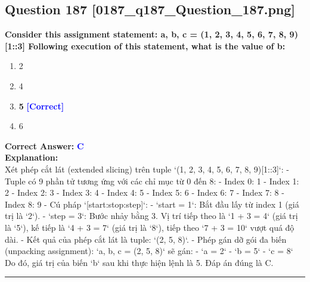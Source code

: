 \documentclass[11pt,a4paper]{article}
\begin{document}
\begin{minipage}{\textwidth}
\subsection*{Question 187 \quad \footnotesize{[0187_q187_Question_187.png]}}
\noindent \textbf{Consider this assignment statement: a, b, c = (1, 2, 3, 4, 5, 6, 7, 8, 9)[1::3] Following execution of this statement, what is the value of b:}

\begin{enumerate}[label=\Alph*.]
    \item 2
    \item 4
    \item \textbf{5} \hfill \textcolor{blue}{\textbf{[Correct]}}
    \item 6
\end{enumerate}

\noindent \textbf{Correct Answer:} \textcolor{blue}{\textbf{C}} \\[4pt]
\noindent \textbf{Explanation:}\\
Xét phép cắt lát (extended slicing) trên tuple `(1, 2, 3, 4, 5, 6, 7, 8, 9)[1::3]`:\newline
- Tuple có 9 phần tử tương ứng với các chỉ mục từ 0 đến 8:\newline
  - Index 0: 1\newline
  - Index 1: 2\newline
  - Index 2: 3\newline
  - Index 3: 4\newline
  - Index 4: 5\newline
  - Index 5: 6\newline
  - Index 6: 7\newline
  - Index 7: 8\newline
  - Index 8: 9\newline
- Cú pháp `[start:stop:step]`:\newline
  - `start = 1`: Bắt đầu lấy từ index 1 (giá trị là `2`).\newline
  - `step = 3`: Bước nhảy bằng 3. Vị trí tiếp theo là `1 + 3 = 4` (giá trị là `5`), kế tiếp là `4 + 3 = 7` (giá trị là `8`), tiếp theo `7 + 3 = 10` vượt quá độ dài.\newline
- Kết quả của phép cắt lát là tuple: `(2, 5, 8)`.\newline
- Phép gán dỡ gói đa biến (unpacking assignment): `a, b, c = (2, 5, 8)` sẽ gán:\newline
  - `a = 2`\newline
  - `b = 5`\newline
  - `c = 8`\newline
Do đó, giá trị của biến `b` sau khi thực hiện lệnh là 5. Đáp án đúng là C.
\end{minipage}
\vspace{0.8cm}
\hrule
\vspace{0.5cm}
\end{document}
